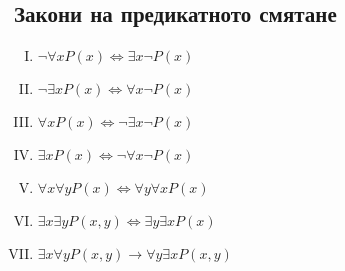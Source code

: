 

\subsection*{Закони на предикатното смятане}

\begin{enumerate}[(I)]
  \item
    $\neg\forall x P(x) \iff \exists x \neg P(x)$
  \item
    $\neg\exists x P(x) \iff \forall x \neg P(x)$
  \item
    $\forall x P(x) \iff \neg\exists x \neg P(x)$
  \item
    $\exists x P(x) \iff \neg\forall x \neg P(x)$
  \item
    $\forall x \forall y P(x) \iff \forall y\forall x P(x)$
  \item
    $\exists x\exists y P(x,y) \iff \exists y \exists x P(x)$  
  \item
    $\exists x\forall y P(x,y) \rightarrow \forall y \exists x P(x,y)$
\end{enumerate}

